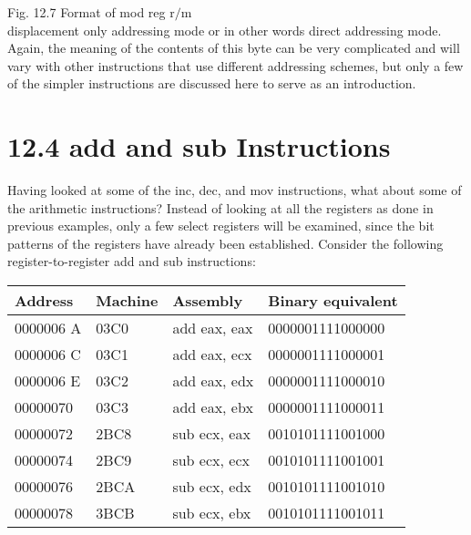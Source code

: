 \documentclass[10pt]{article}
\begin{document}
Fig. 12.7 Format of mod reg $\mathrm{r} / \mathrm{m}$\\
displacement only addressing mode or in other words direct addressing mode. Again, the meaning of the contents of this byte can be very complicated and will vary with other instructions that use different addressing schemes, but only a few of the simpler instructions are discussed here to serve as an introduction.

\section*{12.4 add and sub Instructions}
Having looked at some of the inc, dec, and mov instructions, what about some of the arithmetic instructions? Instead of looking at all the registers as done in previous examples, only a few select registers will be examined, since the bit patterns of the registers have already been established. Consider the following register-to-register add and sub instructions:

\begin{center}
\begin{tabular}{|l|l|l|l|}
\hline
Address & Machine & Assembly & Binary equivalent \\
\hline
0000006 A & 03C0 & add eax, eax & 0000001111000000 \\
\hline
0000006 C & 03C1 & add eax, ecx & 0000001111000001 \\
\hline
0000006 E & 03C2 & add eax, edx & 0000001111000010 \\
\hline
00000070 & 03C3 & add eax, ebx & 0000001111000011 \\
\hline
00000072 & 2BC8 & sub ecx, eax & 0010101111001000 \\
\hline
00000074 & 2BC9 & sub ecx, ecx & 0010101111001001 \\
\hline
00000076 & 2BCA & sub ecx, edx & 0010101111001010 \\
\hline
00000078 & 3BCB & sub ecx, ebx & 0010101111001011 \\
\hline
\end{tabular}
\end{center}
\end{document}
